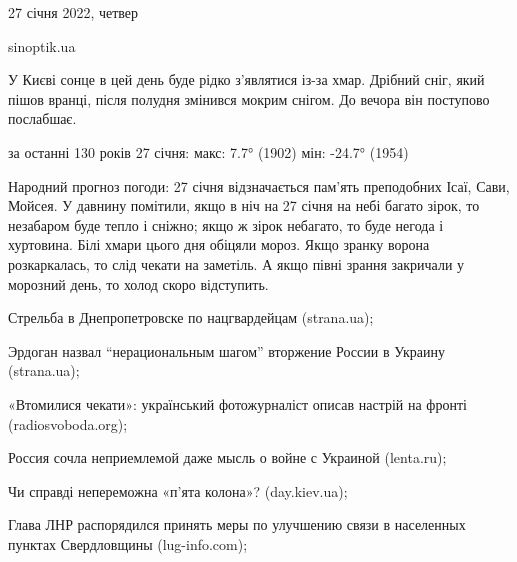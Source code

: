  
 
 
 
 

27 січня 2022, четвер

sinoptik.ua

У Києві сонце в цей день буде рідко з'являтися із-за хмар. Дрібний сніг, який
пішов вранці, після полудня змінився мокрим снігом. До вечора він поступово
послабшає.

за останні 130 років 27 січня: макс: 7.7° (1902) мін: -24.7° (1954)

Народний прогноз погоди: 27 січня відзначається пам’ять преподобних Ісаї, Сави,
Мойсея. У давнину помітили, якщо в ніч на 27 січня на небі багато зірок, то
незабаром буде тепло і сніжно; якщо ж зірок небагато, то буде негода і
хуртовина. Білі хмари цього дня обіцяли мороз. Якщо зранку ворона розкаркалась,
то слід чекати на заметіль. А якщо півні зрання закричали у морозний день, то
холод скоро відступить.

Стрельба в Днепропетровске по нацгвардейцам (strana.ua); 

Эрдоган назвал \enquote{нерациональным шагом} вторжение России в Украину (strana.ua); 

«Втомилися чекати»: український фотожурналіст описав настрій на фронті (radiosvoboda.org); 

Россия сочла неприемлемой даже мысль о войне с Украиной (lenta.ru);

Чи справді непереможна «п’ята колона»? (day.kiev.ua);

Глава ЛНР распорядился принять меры по улучшению связи в населенных пунктах Свердловщины (lug-info.com);


